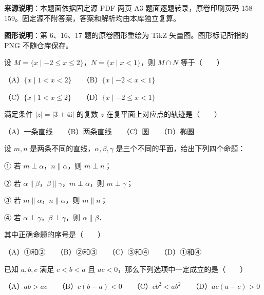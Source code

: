 

\begin{gktip}
\textbf{来源说明}：本题面依据固定源 PDF 两页 A3 题面逐题转录，原卷印刷页码 158–159。固定源不附答案，答案和解析均由本库独立复算。

\textbf{图形说明}：第 6、16、17 题的原卷图形重绘为 TikZ 矢量图。图形标记所指的 PNG 不随仓库保存。
\end{gktip}


\begin{question}
设 $M=\{x\mid -2\le x\le 2\}$，$N=\{x\mid x<1\}$，则 $M\cap N$ 等于\mbox{（　　）}

（A）$\{x\mid 1<x<2\}$　　（B）$\{x\mid -2<x<1\}$

（C）$\{x\mid 1<x\le 2\}$　　（D）$\{x\mid -2\le x<1\}$

\end{question}
\begin{question}
满足条件 $|z|=|3+4\mathrm{i}|$ 的复数 $z$ 在复平面上对应点的轨迹是\mbox{（　　）}

（A）一条直线　　（B）两条直线　　（C）圆　　（D）椭圆

\end{question}
\begin{question}
设 $m, n$ 是两条不同的直线，$\alpha, \beta, \gamma$ 是三个不同的平面，给出下列四个命题：

① 若 $m\perp\alpha$，$n\parallel\alpha$，则 $m\perp n$；

② 若 $\alpha\parallel\beta$，$\beta\parallel\gamma$，$m\perp\alpha$，则 $m\perp\gamma$；

③ 若 $m\parallel\alpha$，$n\parallel\alpha$，则 $m\parallel n$；

④ 若 $\alpha\perp\gamma$，$\beta\perp\gamma$，则 $\alpha\parallel\beta$．

其中正确命题的序号是\mbox{（　　）}

（A）①和②　　（B）②和③　　（C）③和④　　（D）①和④

\end{question}
\begin{question}
已知 $a, b, c$ 满足 $c<b<a$ 且 $ac<0$，那么下列选项中一定成立的是\mbox{（　　）}

（A）$ab>ac$　　（B）$c(b-a)<0$　　（C）$cb^2<ab^2$　　（D）$ac(a-c)>0$

\end{question}
